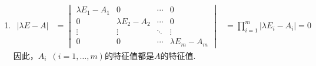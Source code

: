 \documentclass[UTF8,12pt,a4paper,fontset=fandol]{ctexart}
\begin{document}
\begin{solve}
\begin{enumerate}
        \item \begin{align*}
                  |\lambda E-A| & =\begin{vmatrix}
                                       \lambda E_1-A_1 & 0               & \cdots & 0               \\
                                       0               & \lambda E_2-A_2 & \cdots & 0               \\
                                       \vdots          & \vdots          & \ddots & \vdots          \\
                                       0               & 0               & \cdots & \lambda E_m-A_m
                                   \end{vmatrix}
                                & =\prod_{i=1}^{m}|\lambda E_i-A_i|=0
              \end{align*}
              因此，$A_i\enspace(i=1,\ldots,m)$的特征值都是$A$的特征值.
    \end{enumerate}
\end{solve}
\end{document}

